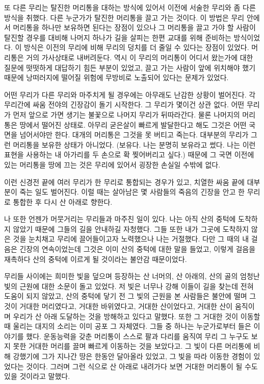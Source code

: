 \begin{article}
또 다른 무리는 탈진한 머리통을 대하는 방식에 있어서 이전에 서술한 무리와 좀 다른 방식을 취했다. 다른 누군가가 탈진한 머리통을 끌고 가는 것이다. 이 방법은 무리 안에서 머리통을 하나만 보유하면 된다는 장점이 있으나 그 머리통을 끌고 가야 할 사람이 탈진할 경우를 대비해 나머지 하나가 길을 살피는 한편 교대를 위해 준비하는 방식이었다. 이 방식은 이전의 무리에 비해 무리의 덩치를 더 줄일 수 있다는 장점이 있었다. 머리통은 거의 가사상태로 내버려둔다. 역시 이 무리의 머리통이 어디서 왔는가에 대한 질문에 떳떳하게 대답하기 힘든 부분이 있었고, 끌고 가는 사람이 앞에 위치해야 했기 때문에 낭떠러지에 떨어질 위험에 무방비로 노출되어 있다는 문제가 있었다.

어떤 무리가 다른 무리와 마주치게 될 경우에는 아무래도 난감한 상황이 벌어진다. 각 무리간에 싸움 전야의 긴장감이 돌기 시작한다. 그 무리가 몇이건 상관 없다. 어떤 무리가 먼저 앞으로 가면 생기는 불꽃으로 나머지 무리가 뒤따라간다. 물론 나머지의 머리통은 땅에서 떨어진 상태로. 아무리 굳은살이 빠르게 발달한다고 해도 그것은 어떤 국면을 넘어서야만 한다. 대개의 머리통은 그것을 못 버티고 죽는다. 대부분의 무리가 그런 머리통을 보유한 상태가 아니었다. (보유다. 나는 분명히 보유라고 썼다. 나는 이런 표현을 사용하는 내 아가리를 두 손으로 확 찢어버리고 싶다.) 때문에 그 국면 이전에 있는 머리통을 땅에 끄는 것은 무리에 있어서 굉장한 손실일 수밖에 없다.

이런 신경전 끝에 여러 무리가 한 무리로 통합되는 경우가 있고, 치열한 싸움 끝에 대부분이 죽는 일도 벌어진다. 이럴 때는 살아남은 몇 사람들의 죽음의 긴장을 안고 한 무리로 통합한 후 다시 산 아래로 향한다.

나 또한 언젠가 머뭇거리는 무리들과 마주친 일이 있다. 나는 아직 산의 중턱에 도착하지 않았기 때문에 그들의 길을 안내하길 자청했다. 그들 또한 내가 그곳에 도착하지 않은 것을 눈치채고 무리에 끌어들이고자 노력했으나 나는 거절했다. 다만 그 때의 내 걸음은 긴장의 연속이었는데 그것은 이미 산의 중턱에 대한 말을 들었고, 이렇게 걸음을 재촉하다 산의 중턱에 이르게 될 것이라는 불안감 때문이었다.

무리들 사이에는 희미한 빛을 덮으며 등장하는 산 너머의, 산 아래의, 산의 골의 엄청난 빛의 근원에 대한 소문이 돌고 있었다. 저 빛은 너무나 강해 이들이 길을 찾는데 전혀 도움이 되지 않았고, 산의 중턱에 닿기 전 그 빛의 근원을 본 사람들은 불안에 떨며 그것이 거대한 머리였다고, 거대한 바위였다고, 거대한 산이었다고, 거대한 산이 움직이며 우리가 산 아래 도달하는 것을 방해하고 있다고 말했다. 또한 그 거대한 것이 이동할 때 울리는 대지의 소리는 이미 공포 그 자체였다. 그들 중 하나는 누군가로부터 들은 이야기를 했다. 운동능력을 갖춘 머리통이 스스로 팔과 다리를 움직여 무리 그 누구도 보지 못한 거대한 머리를 끌며 빠르게 이동하는 것을 보았다고. 그 빛이 다른 머리통에 비해 강했기에 그가 지나간 땅은 한동안 달아올라 있었고, 그 빛을 따라 이동한 경험이 있었다는 것이다. 그러며 그런 식으로 산 아래로 내려가다 보면 거대한 머리통이 될 수도 있을 것이라고 말했다.


\end{article}
